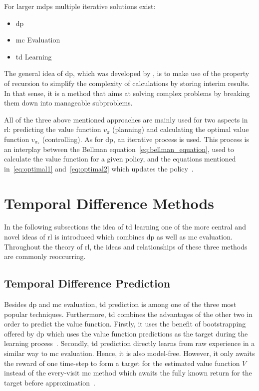 \documentclass[draft,final]{vutinfth} %
\newcommand{\p}[1]{see p. #1}
\begin{document}
    For larger \glspl{mdp} multiple iterative solutions exist:
    \begin{itemize}
        \item \gls{dp}
        \item \gls{mc} Evaluation
        \item \gls{td} Learning
    \end{itemize}

    The general idea of \gls{dp}, which was developed by \citeauthor{bellman_theory_1954}, is to make use of the property of recursion to simplify the complexity of calculations by storing interim results.
    In that sense, it is a method that aims at solving complex problems by breaking them down into manageable subproblems.

    All of the three above mentioned approaches are mainly used for two aspects in \gls{rl}: predicting the value function $v_\pi$ (planning) and calculating the optimal value function $v_{\pi_*}$ (controlling).
    As for \gls{dp}, an iterative process is used.
    This process is an interplay between the Bellman equation~\eqref{eq:bellman_equation}, used to calculate the value function for a given policy, and the equations mentioned in~\ref{eq:optimal1} and~\ref{eq:optimal2} which updates the policy~.


    \section{Temporal Difference Methods}

    In the following subsections the idea of \gls{td} learning one of the more central and novel ideas of \gls{rl} is introduced which combines \gls{dp} as well as \gls{mc} evaluation.
    Throughout the theory of \gls{rl}, the ideas and relationships of these three methods are commonly reoccurring.

    \subsection{Temporal Difference Prediction}
    Besides \gls{dp} and \gls{mc} evaluation, \gls{td} prediction is among one of the three most popular techniques.
    Furthermore, \gls{td} combines the advantages of the other two in order to predict the value function.
    Firstly, it uses the benefit of bootstrapping offered by \gls{dp} which uses the value function predictions as the target during the learning process~\citep[\p{18}]{szepesvari_algorithms_2010}.
    Secondly, \gls{td} prediction directly learns from raw experience in a similar way to \gls{mc} evaluation.
    Hence, it is also model-free.
    However, it only awaits the reward of one time-step to form a target for the estimated value function $V$ instead of the every-visit \gls{mc} method which awaits the fully known return for the target before approximation~\citep[\p{120}]{sutton_reinforcement_2018}.
\end{document}
